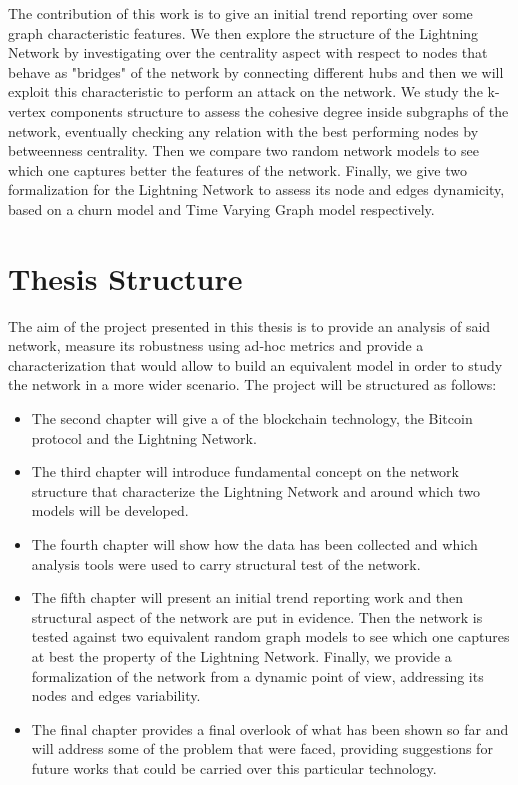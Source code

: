		The contribution of this work is to give an initial trend reporting over some graph characteristic features. We then explore the structure of the Lightning Network by investigating over the centrality aspect with respect to nodes that behave as "bridges" of the network by connecting different hubs and then we will exploit this characteristic to  perform an attack on the network. We study the k-vertex components structure to assess the cohesive degree inside subgraphs of the network, eventually checking any relation with the best performing nodes by betweenness centrality. Then we compare two random network models to see which one captures better the features of the network. Finally, we give two formalization for the Lightning Network to assess its node and edges dynamicity, based on a churn model and Time Varying Graph model respectively.
	\section{Thesis Structure}
	
	The aim of the project presented in this thesis is to provide an analysis of said network, measure its robustness using ad-hoc metrics and provide a characterization that would allow to build an equivalent model in order to study the network in a more wider scenario. The project will be structured as follows:
	\begin{itemize}
		\item The second chapter will give a  of the blockchain technology, the Bitcoin protocol and the Lightning Network.
		\item The third chapter will introduce fundamental concept on the network structure that characterize the Lightning Network and around which two models will be developed.
		\item The fourth chapter will show how the data has been collected and which analysis tools were used to carry structural test of the network.
		\item The fifth chapter will present an initial trend reporting work and then structural aspect of the network are put in evidence. Then the network is tested against two equivalent random graph models to see which one captures at best the property of the Lightning Network. Finally, we provide a formalization of the network from a dynamic point of view, addressing its nodes and edges variability.
		\item The final chapter provides a final overlook of what has been shown so far and will address some of the problem that were faced, providing suggestions for future works that could be carried over this particular technology.
	\end{itemize}
